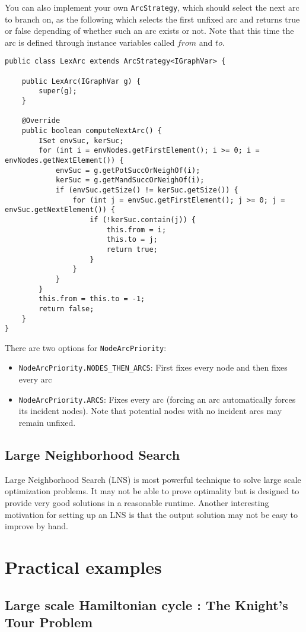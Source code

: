 \documentclass{article}
\begin{document}
You can also implement your own \texttt{ArcStrategy}, which should select the next arc to branch on, as the following which selects the first unfixed arc and returns true or false depending of whether such an arc exists or not. 
Note that this time the arc is defined through instance variables called $from$ and $to$. 
\begin{lstlisting}
public class LexArc extends ArcStrategy<IGraphVar> {

	public LexArc(IGraphVar g) {
		super(g);
	}

	@Override
	public boolean computeNextArc() {
		ISet envSuc, kerSuc;
		for (int i = envNodes.getFirstElement(); i >= 0; i = envNodes.getNextElement()) {
			envSuc = g.getPotSuccOrNeighOf(i);
			kerSuc = g.getMandSuccOrNeighOf(i);
			if (envSuc.getSize() != kerSuc.getSize()) {
				for (int j = envSuc.getFirstElement(); j >= 0; j = envSuc.getNextElement()) {
					if (!kerSuc.contain(j)) {
						this.from = i;
						this.to = j;
						return true;
					}
				}
			}
		}
		this.from = this.to = -1;
		return false;
	}
}
\end{lstlisting}

There are two options for \texttt{NodeArcPriority}:
\begin{itemize}
\item \texttt{NodeArcPriority.NODES\_THEN\_ARCS}: First fixes every node and then fixes every arc
\item \texttt{NodeArcPriority.ARCS}: Fixes every arc (forcing an arc automatically forces its incident nodes). Note that potential nodes with no incident arcs may remain unfixed. 
\end{itemize}

\subsection{Large Neighborhood Search}

Large Neighborhood Search (LNS) is most powerful technique to solve large scale optimization problems. It may not be able to prove optimality but is designed to provide very good solutions in a reasonable runtime. Another interesting motivation for setting up an LNS is that the output solution may not be easy to improve by hand. 

\newpage{}
\section{Practical examples}

\subsection{Large scale Hamiltonian cycle : The Knight's Tour Problem}
\end{document}
